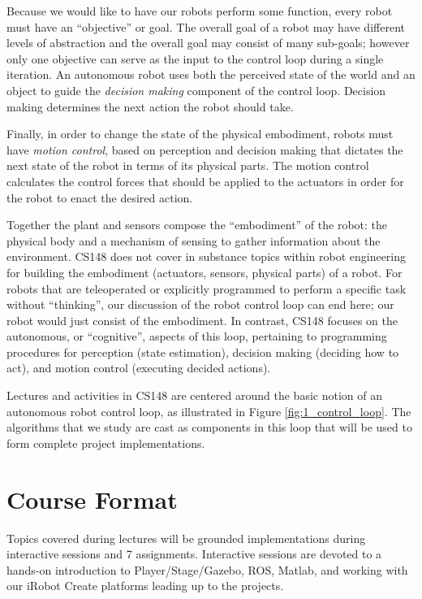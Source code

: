 Because we would like to have our robots perform some function, every robot must have an ``objective'' or goal. The overall goal of a robot may have different levels of abstraction and the overall goal may consist of many sub-goals; however only one objective can serve as the input to the control loop during a single iteration. An autonomous robot uses both the perceived state of the world and an object to guide the \textit{decision making} component of the control loop. Decision making determines the next action the robot should take.

Finally, in order to change the state of the physical embodiment, robots must have \textit{motion control}, based on perception and decision making that dictates the next state of the robot in terms of its physical parts. The motion control calculates the control forces that should be applied to the actuators in order for the robot to enact the desired action.

Together the plant and sensors compose the ``embodiment'' of the robot: the physical body and a mechanism of sensing to gather information about the environment. CS148 does not cover in substance topics within robot engineering for building the embodiment (actuators, sensors, physical parts) of a robot. For robots that are teleoperated or explicitly programmed to perform a specific task without ``thinking'', our discussion of the robot control loop can end here; our robot would just consist of the embodiment. 
In contrast, CS148 focuses on the autonomous, or ``cognitive'', aspects of this loop, pertaining to programming procedures for perception (state estimation), decision making (deciding how to act), and motion control (executing decided actions).

Lectures and activities in CS148 are centered around the basic notion of an autonomous robot control loop, as illustrated in Figure \ref{fig:1_control_loop}. The algorithms that we study are cast as components in this loop that will be used to form complete project implementations. 

\section{Course Format}

Topics covered during lectures will be grounded implementations during interactive sessions and 7 assignments.  Interactive sessions are devoted to a hands-on introduction to Player/Stage/Gazebo, ROS, Matlab, and working with our iRobot Create platforms leading up to the projects.

